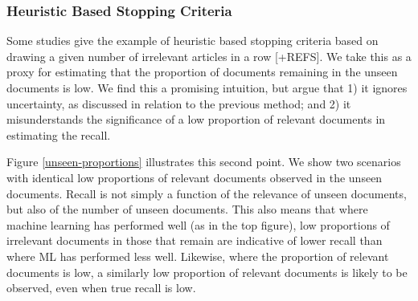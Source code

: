 \documentclass{bmcart}
\begin{document}
		
\subsubsection*{Heuristic Based Stopping Criteria}

Some studies give the example of heuristic based stopping criteria based on drawing a given number of irrelevant articles in a row \cite{Przybya2018} [+REFS]. 
We take this as a proxy for estimating that the proportion of documents remaining in the unseen documents is low. 
We find this a promising intuition, but argue that 1) it ignores uncertainty, as discussed in relation to the previous method; and 2) it misunderstands the significance of a low proportion of relevant documents in estimating the recall.

Figure \ref{unseen-proportions} illustrates this second point. 
We show two scenarios with identical low proportions of relevant documents observed in the unseen documents. 
Recall is not simply a function of the relevance of unseen documents, but also of the number of unseen documents. 
This also means that where machine learning has performed well (as in the top figure), low proportions of irrelevant documents in those that remain are indicative of lower recall than where ML has performed less well.
Likewise, where the proportion of relevant documents is low, a similarly low proportion of relevant documents is likely to be observed, even when true recall is low.
\end{document}
